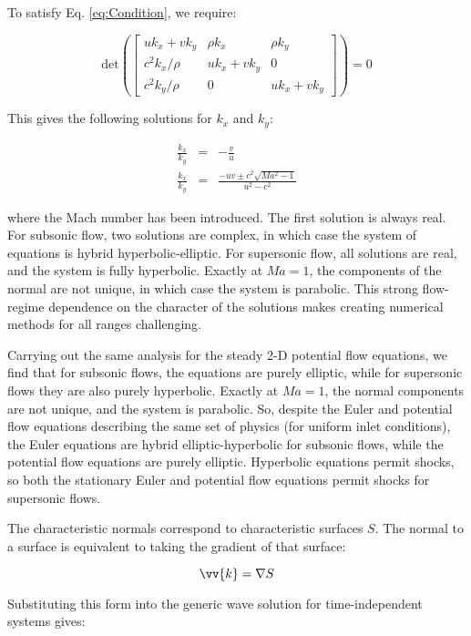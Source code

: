 \documentclass[10pt]{article}
\newcommand{\beq}{\begin{equation}}
\newcommand{\eeq}{\end{equation}}
\begin{document}
\begin{flushleft}
To satisfy Eq. \eqref{eq:Condition}, we require:

\beq
\text{det}\left(\begin{bmatrix}
uk_x+vk_y & \rho k_x & \rho k_y\\
c^2k_x/\rho & uk_x+vk_y & 0\\
c^2k_y/\rho & 0 & uk_x+vk_y
\end{bmatrix}\right)=0
\eeq

This gives the following solutions for \(k_x\) and \(k_y\):

\begin{subequations}
\begin{eqnarray}
\frac{k_x}{k_y}&=&-\frac{v}{u}\\
\frac{k_x}{k_y}&=&\frac{-uv\pm c^2\sqrt{Ma^2-1}}{u^2-c^2}
\end{eqnarray}
\end{subequations}

where the Mach number has been introduced. The first solution is always real. For subsonic flow, two solutions are complex, in which case the system of equations is hybrid hyperbolic-elliptic. For supersonic flow, all solutions are real, and the system is fully hyperbolic. Exactly at \(Ma=1\), the components of the normal are not unique, in which case the system is parabolic. This strong flow-regime dependence on the character of the solutions makes creating numerical methods for all ranges challenging. 

Carrying out the same analysis for the steady 2-D potential flow equations, we find that for subsonic flows, the equations are purely elliptic, while for supersonic flows they are also purely hyperbolic. Exactly at \(Ma=1\), the normal components are not unique, and the system is parabolic. So, despite the Euler and potential flow equations describing the same set of physics (for uniform inlet conditions), the Euler equations are hybrid elliptic-hyperbolic for subsonic flows, while the potential flow equations are purely elliptic. Hyperbolic equations permit shocks, so both the stationary Euler and potential flow equations permit shocks for supersonic flows.

The characteristic normals correspond to characteristic surfaces \(S\). The normal to a surface is equivalent to taking the gradient of that surface:

\beq
\vv{k}=\nabla S
\eeq

Substituting this form into the generic wave solution for time-independent systems gives:


\end{flushleft}
\end{document}
